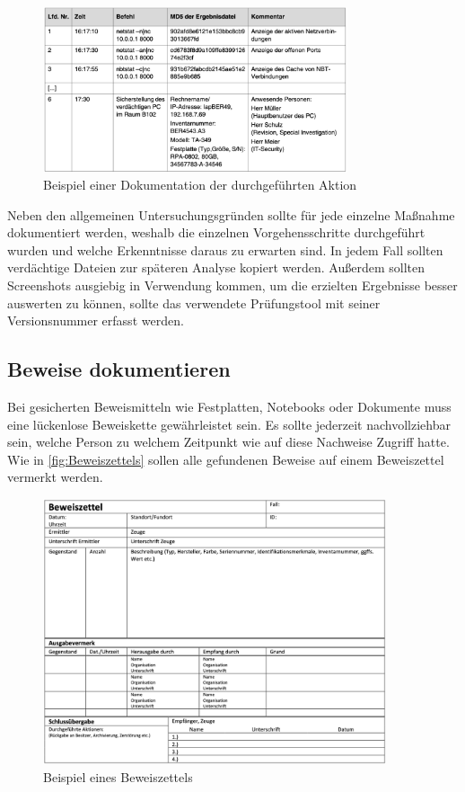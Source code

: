 \documentclass[12pt,DIV=14, version=first, BCOR=10mm,a4paper,twoside,parskip=half-,headsepline,headinclude]{scrartcl}
\begin{document}
    \begin{figure}[h] 
    	\centering
    	\includegraphics[width=0.8\textwidth]{bilder/dokumentation_von_aktionen.png} 
    	\caption{Beispiel einer Dokumentation der durchgeführten Aktion \cite[S. 84]{texbook01}}
    	\label{fig:Dokumentation}
    \end{figure}
	Neben den allgemeinen Untersuchungsgründen sollte für jede einzelne Maßnahme dokumentiert werden, weshalb die einzelnen Vorgehensschritte durchgeführt wurden und welche Erkenntnisse daraus zu erwarten sind. In jedem Fall sollten verdächtige Dateien zur späteren Analyse kopiert werden. Außerdem sollten Screenshots ausgiebig in Verwendung kommen, um die erzielten Ergebnisse besser auswerten zu können, sollte das verwendete Prüfungstool mit seiner Versionsnummer erfasst werden.
    
    \subsection{Beweise dokumentieren}
    Bei gesicherten Beweismitteln wie Festplatten, Notebooks oder Dokumente muss eine lückenlose Beweiskette gewährleistet sein. Es sollte jederzeit nachvollziehbar sein, welche Person zu welchem Zeitpunkt wie auf diese Nachweise Zugriff hatte. Wie in \autoref{fig:Beweiszettels} sollen alle gefundenen Beweise auf einem Beweiszettel vermerkt werden.
    \begin{figure}[h]
        \centering
        \includegraphics[width=0.9\textwidth]{bilder/Beweiszettels.png} 
        \caption{Beispiel eines Beweiszettels}
        \label{fig:Beweiszettels}
    \end{figure}
    
\end{document}
